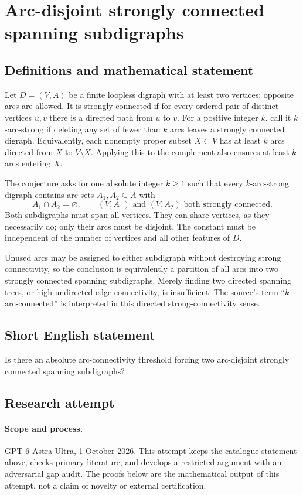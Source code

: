 \documentclass[11pt,a4paper]{article}
\begin{document}
\section*{Arc-disjoint strongly connected spanning subdigraphs}\label{statement}

\subsection{Definitions and mathematical statement}
Let $D=(V,A)$ be a finite loopless digraph with at least two vertices;
opposite arcs are allowed. It is strongly connected if for every ordered
pair of distinct vertices $u,v$ there is a directed path from $u$ to $v$.
For a positive integer $k$, call it $k$-arc-strong if deleting any set
of fewer than $k$ arcs leaves a strongly connected digraph.
Equivalently, each nonempty proper subset $X\subset V$ has at least
$k$ arcs directed from $X$ to $V\setminus X$. Applying this to the
complement also ensures at least $k$ arcs entering $X$.

The conjecture asks for one absolute integer $k\ge1$ such that every
$k$-arc-strong digraph contains arc sets $A_1,A_2\subseteq A$ with
\[
 A_1\cap A_2=\varnothing,\qquad
 (V,A_1)\text{ and }(V,A_2)\text{ both strongly connected}.
\]
Both subdigraphs must span all vertices. They can share vertices, as
they necessarily do; only their arcs must be disjoint. The constant
must be independent of the number of vertices and all other features
of $D$.

Unused arcs may be assigned to either subdigraph without destroying
strong connectivity, so the conclusion is equivalently a partition of
all arcs into two strongly connected spanning subdigraphs. Merely finding
two directed spanning trees, or high undirected edge-connectivity, is
insufficient. The source's term ``$k$-arc-connected'' is interpreted in
this directed strong-connectivity sense.
\subsection{Short English statement}
Is there an absolute arc-connectivity threshold forcing two arc-disjoint strongly connected spanning subdigraphs?
\subsection{Research attempt}
\paragraph{Scope and process.}
GPT-6 Astra Ultra, 1 October 2026. This attempt keeps the catalogue statement above, checks primary literature, and develops a restricted argument with an adversarial gap audit. The proofs below are the mathematical output of this attempt, not a claim of novelty or external certification.
\end{document}
